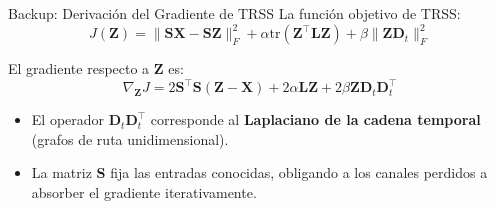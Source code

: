\documentclass[10pt, aspectratio=169]{beamer}
\begin{document}
\begin{frame}{Backup: Derivación del Gradiente de TRSS}
    La función objetivo de TRSS:
    \[ J(\mathbf{Z}) = \|\mathbf{S}\mathbf{X} - \mathbf{S}\mathbf{Z}\|_F^2 + \alpha \text{tr}(\mathbf{Z}^\top \mathbf{L} \mathbf{Z}) + \beta \|\mathbf{Z}\mathbf{D}_t\|_F^2 \]
    
    El gradiente respecto a $\mathbf{Z}$ es:
    \[ \nabla_{\mathbf{Z}} J = 2 \mathbf{S}^\top \mathbf{S} (\mathbf{Z} - \mathbf{X}) + 2 \alpha \mathbf{L} \mathbf{Z} + 2 \beta \mathbf{Z} \mathbf{D}_t \mathbf{D}_t^\top \]
    
    \begin{itemize}
        \item El operador $\mathbf{D}_t \mathbf{D}_t^\top$ corresponde al \textbf{Laplaciano de la cadena temporal} (grafos de ruta unidimensional).
        \item La matriz \textbf{S} fija las entradas conocidas, obligando a los canales perdidos a absorber el gradiente iterativamente.
    \end{itemize}
\end{frame}
\end{document}
